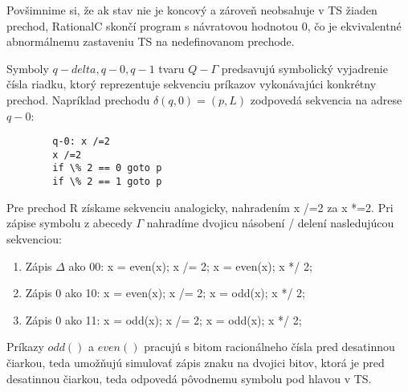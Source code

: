 \documentclass[10pt]{article}
\begin{document}
        Povšimnime si, že ak stav nie je koncový a zároveň neobsahuje v TS žiaden prechod, RationalC
        skončí program s návratovou hodnotou 0, čo je ekvivalentné abnormálnemu zastaveniu TS na
        nedefinovanom prechode.

        Symboly $q-delta, q-0, q-1$ tvaru $Q-\Gamma$ predsavujú symbolický vyjadrenie čísla riadku, ktorý
        reprezentuje sekvenciu príkazov vykonávajúci konkrétny prechod.
        Napríklad prechodu $\delta(q, 0) = (p, L)$ zodpovedá sekvencia na adrese $q-0$:
        \begin{verbatim}
        q-0: x /=2
        x /=2
        if \% 2 == 0 goto p
        if \% 2 == 1 goto p
        \end{verbatim}
        Pre prechod R získame sekvenciu analogicky, nahradením x /=2 za x *=2.
        Pri zápise symbolu z abecedy $\Gamma$ nahradíme dvojicu násobení / delení nasledujúcou
        sekvenciou:
        \begin{enumerate}
            \item Zápis $\Delta$ ako 00: x = even(x); x /= 2; x = even(x); x */ 2;
            \item Zápis $0$ ako 10: x = even(x); x /= 2; x = odd(x); x */ 2;
            \item Zápis $0$ ako 11: x = odd(x); x /= 2; x = odd(x); x */ 2;
        \end{enumerate}
        Príkazy $odd()$ a $even()$ pracujú s bitom racionálneho čísla pred desatinnou čiarkou, teda
        umožňujú simulovať zápis znaku na dvojici bitov, ktorá je pred desatinnou čiarkou, teda
        odpovedá pôvodnemu symbolu pod hlavou v TS.
\end{document}
